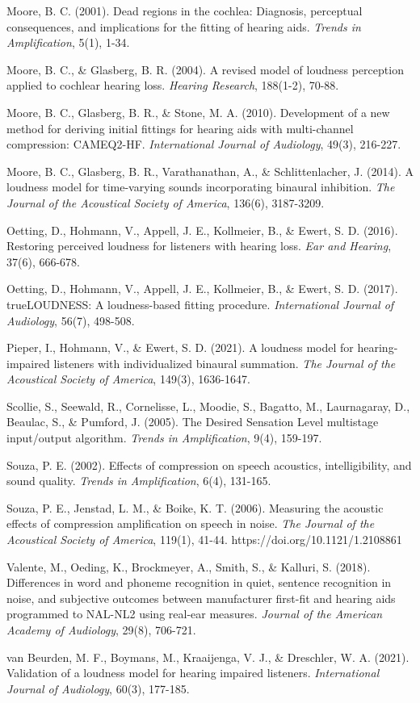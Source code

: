 \documentclass[
  12pt,
]{article}
\begin{document}
Moore, B. C. (2001). Dead regions in the cochlea: Diagnosis, perceptual
consequences, and implications for the fitting of hearing aids.
\emph{Trends in Amplification}, 5(1), 1-34.

Moore, B. C., \& Glasberg, B. R. (2004). A revised model of loudness
perception applied to cochlear hearing loss. \emph{Hearing Research},
188(1-2), 70-88.

Moore, B. C., Glasberg, B. R., \& Stone, M. A. (2010). Development of a
new method for deriving initial fittings for hearing aids with
multi-channel compression: CAMEQ2-HF. \emph{International Journal of
Audiology}, 49(3), 216-227.

Moore, B. C., Glasberg, B. R., Varathanathan, A., \& Schlittenlacher, J.
(2014). A loudness model for time-varying sounds incorporating binaural
inhibition. \emph{The Journal of the Acoustical Society of America},
136(6), 3187-3209.

Oetting, D., Hohmann, V., Appell, J. E., Kollmeier, B., \& Ewert, S. D.
(2016). Restoring perceived loudness for listeners with hearing loss.
\emph{Ear and Hearing}, 37(6), 666-678.

Oetting, D., Hohmann, V., Appell, J. E., Kollmeier, B., \& Ewert, S. D.
(2017). trueLOUDNESS: A loudness-based fitting procedure.
\emph{International Journal of Audiology}, 56(7), 498-508.

Pieper, I., Hohmann, V., \& Ewert, S. D. (2021). A loudness model for
hearing-impaired listeners with individualized binaural summation.
\emph{The Journal of the Acoustical Society of America}, 149(3),
1636-1647.

Scollie, S., Seewald, R., Cornelisse, L., Moodie, S., Bagatto, M.,
Laurnagaray, D., Beaulac, S., \& Pumford, J. (2005). The Desired
Sensation Level multistage input/output algorithm. \emph{Trends in
Amplification}, 9(4), 159-197.

Souza, P. E. (2002). Effects of compression on speech acoustics,
intelligibility, and sound quality. \emph{Trends in Amplification},
6(4), 131-165.

Souza, P. E., Jenstad, L. M., \& Boike, K. T. (2006). Measuring the
acoustic effects of compression amplification on speech in noise.
\emph{The Journal of the Acoustical Society of America}, 119(1), 41-44.
https://doi.org/10.1121/1.2108861

Valente, M., Oeding, K., Brockmeyer, A., Smith, S., \& Kalluri, S.
(2018). Differences in word and phoneme recognition in quiet, sentence
recognition in noise, and subjective outcomes between manufacturer
first-fit and hearing aids programmed to NAL-NL2 using real-ear
measures. \emph{Journal of the American Academy of Audiology}, 29(8),
706-721.

van Beurden, M. F., Boymans, M., Kraaijenga, V. J., \& Dreschler, W. A.
(2021). Validation of a loudness model for hearing impaired listeners.
\emph{International Journal of Audiology}, 60(3), 177-185.
\end{document}
